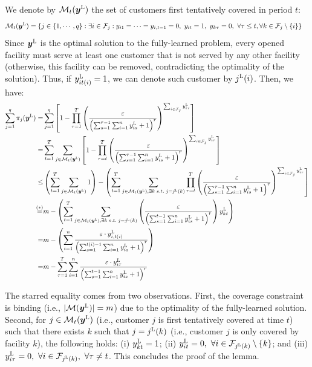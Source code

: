 \documentclass[nonblindrev]{informs3noheader}
\def\calF{\mathcal{F}}
\def\calM{\mathcal{M}}
\def\by{\boldsymbol{y}}
\begin{document}
We denote by $\calM_t(\by^{\textsc{L}})$ the set of customers first tentatively covered in period $t$:
\begin{align*}
    \calM_t(\by^{\textsc{L}})&=\left\{j\in\{1,\cdots,q\}:\exists i\in\calF_j:y_{i1}=\cdots=y_{i,t-1}=0,\ y_{it}=1,\ y_{k\tau}=0,\ \forall \tau\leq t,\forall k\in\calF_j\setminus\{i\}\right\}
\end{align*}
Since $\by^{\textsc{L}}$ is the optimal solution to the fully-learned problem, every opened facility must serve at least one customer that is not served by any other facility (otherwise, this facility can be removed, contradicting the optimality of the solution). Thus, if $y^{\textsc{L}}_{it(i)}=1$, we can denote such customer by $j^{\textsc{L}}(i)$. Then, we have:
\begin{align*}
    \sum_{j=1}^q \pi_{j}(\by^{\textsc{L}})
    =&\sum_{j=1}^q\left[1-\prod_{\tau=1}^T \left(\frac{\varepsilon}{\left(\sum_{s=1}^{\tau-1}\sum_{i=1}^n y^{\textsc{L}}_{is}+1\right)^r}\right)^{\sum_{i \in \calF_j} y^{\textsc{L}}_{i\tau}}\right]\\
    =&\sum_{t=1}^T\sum_{j \in \calM_t(\by^{\textsc{L}})} \left[1-\prod_{\tau=t}^T \left(\frac{\varepsilon}{\left(\sum_{s=1}^{\tau-1}\sum_{i=1}^n y^{\textsc{L}}_{is}+1\right)^r}\right)^{\sum_{i \in \calF_j} y^{\textsc{L}}_{i\tau}}\right]\\
    \leq &\left(\sum_{t=1}^T\sum_{j \in \calM_t(\by^{\textsc{L}})} 1\right)-\left(\sum_{t=1}^T\sum_{j \in \calM_t(\by^{\textsc{L}}), \exists k\;s.t.\;j=j^{\textsc{L}}(k)}\prod_{\tau=t}^T \left(\frac{\varepsilon}{\left(\sum_{s=1}^{\tau-1}\sum_{i=1}^n y^{\textsc{L}}_{is}+1\right)^r}\right)^{\sum_{i \in \calF_j} y^{\textsc{L}}_{i\tau}}\right]\\
    \overset{{(*)}}{=}& m-\left(\sum_{t=1}^T\sum_{j \in \calM_t(\by^{\textsc{L}}), \exists k\;s.t.\;j=j^{\textsc{L}}(k)} \left(\frac{\varepsilon}{\left(\sum_{s=1}^{t-1}\sum_{i=1}^n y^{\textsc{L}}_{is}+1\right)^r}\right)y^{\textsc{L}}_{kt}\right)\\
    =&m-\left(\sum_{i=1}^n \frac{\varepsilon\cdot y^{\textsc{L}}_{i,t(i)}}{\left(\sum_{s=1}^{t(i)-1}\sum_{i=1}^n y^{\textsc{L}}_{is}+1\right)^r}\right)\\
    =&m-\sum_{\tau=1}^T\sum_{i=1}^n\frac{\varepsilon\cdot y^{\textsc{L}}_{i\tau}}{\left(\sum_{s=1}^{t-1}\sum_{i=1}^n y^{\textsc{L}}_{is}+1\right)^r}
\end{align*}

The starred equality comes from two observations. First, the coverage constraint is binding (i.e., $|\calM(\by^{\textsc{L}})|=m$) due to the optimality of the fully-learned solution. Second, for $j\in \calM_t(\by^{\textsc{L}})$ (i.e., customer $j$ is first tentatively covered at time $t$) such that there exists $k$ such that $j=j^{\textsc{L}}(k)$ (i.e., customer $j$ is only covered by facility $k$), the following holds: (i) $y^{\textsc{L}}_{kt}=1$; (ii) $y^{\textsc{L}}_{it} =0,\ \forall i\in\calF_{j^{\textsc{L}}(k)}\setminus\{k\}$; and (iii) $y^{\textsc{L}}_{i\tau} =0,\ \forall i\in\calF_{j^{\textsc{L}}(k)},\ \forall \tau\neq t$. This concludes the proof of the lemma.
\hfill\Halmos
\end{document}
